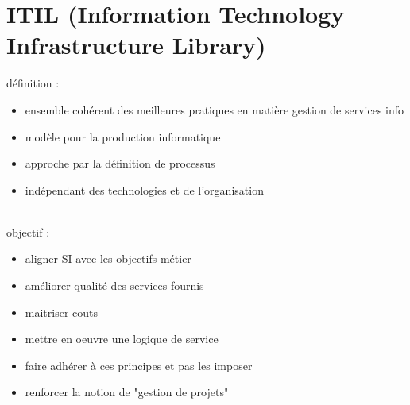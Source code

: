 \section{ITIL (Information Technology Infrastructure Library)}

définition :
\begin{itemize}
\item ensemble cohérent des meilleures pratiques en matière gestion de services info
\item modèle pour la production informatique
\item approche par la définition de processus
\item indépendant des technologies et de l’organisation
\end{itemize}

\hfill\\

objectif :
\begin{itemize}
\item aligner SI avec les objectifs métier
\item améliorer qualité des services fournis
\item maitriser couts
\item mettre en oeuvre une logique de service
\item faire adhérer à ces principes et pas les imposer
\item renforcer la notion de "gestion de projets"
\end{itemize}
